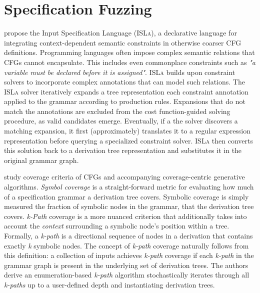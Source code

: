 \section{\label{sec:specification_fuzzing}Specification Fuzzing}

\citet{steinhofel2022input} propose the Input Specification Language (\textsc{ISLa}),
a declarative language for integrating context-dependent semantic constraints
in otherwise coarser \gls{CFG} definitions.
Programming languages often impose complex semantic relations that 
\gls{CFG}s cannot encapsulate.
This includes even commonplace constraints such as \textit{"a variable must be
declared before it is assigned"}.
\textsc{ISLa} builds upon constraint solvers to incorporate complex annotations
that can model such relations. 
The \textsc{ISLa} solver iteratively expands a tree representation
each constraint annotation applied to the grammar according to production rules.
Expansions that do not match the annotations are excluded from the
cost function-guided solving procedure, as valid candidates emerge.
Eventually, if a the solver discovers a matching expansion, it first
(approximately) translates it to a regular expression representation
before querying a specialized constraint solver.
\textsc{ISLa} then converts this solution back to a 
derivation tree representation and substitutes it in the
original grammar graph.

\citet{havrikov2019systematically} study coverage criteria of \gls{CFG}s and 
accompanying coverage-centric generative algorithms.
\textit{Symbol coverage} is a straight-forward metric for evaluating
how much of a specification grammar a derivation tree covers.
Symbolic coverage is simply measured the fraction of symbolic nodes in the
grammar, that the derivation tree covers.
\textit{k-Path} coverage is a more nuanced criterion that additionally
takes into account the \textit{context} surrounding a symbolic node's
position within a tree. 
Formally, a \textit{k-path} is a directional sequence of nodes in a derivation 
that contains exactly \textit{k} symbolic nodes.
The concept of \textit{k-path} coverage naturally follows from this
definition: a collection of inputs achieves \textit{k-path} coverage if
each \textit{k-path} in the grammar graph is present in the underlying
set of derivation trees.
The authors derive an enumeration-based \textit{k-path} algorithm
stochastically iterates through all \textit{k-paths} up to a user-defined
depth and instantiating derivation trees.

